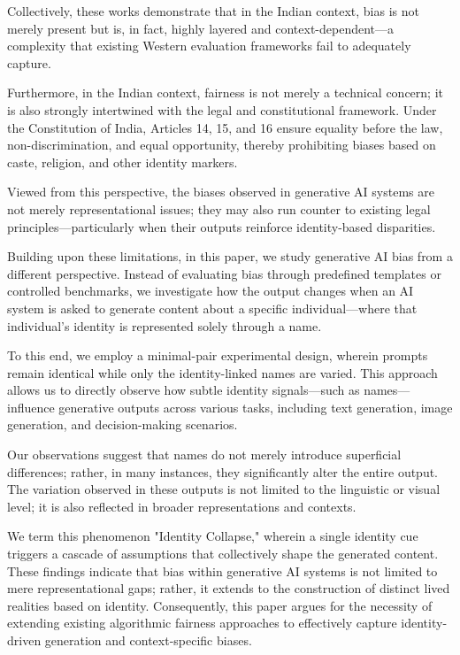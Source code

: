 \documentclass[sigplan,screen]{acmart}
\begin{document}
Collectively, these works demonstrate that in the Indian context, bias is not merely present but is, in fact, highly layered and context-dependent—a complexity that existing Western evaluation frameworks fail to adequately capture.


Furthermore, in the Indian context, fairness is not merely a technical concern; it is also strongly intertwined with the legal and constitutional framework. Under the Constitution of India, Articles 14, 15, and 16 ensure equality before the law, non-discrimination, and equal opportunity, thereby prohibiting biases based on caste, religion, and other identity markers.

Viewed from this perspective, the biases observed in generative AI systems are not merely representational issues; they may also run counter to existing legal principles—particularly when their outputs reinforce identity-based disparities.


Building upon these limitations, in this paper, we study generative AI bias from a different perspective. Instead of evaluating bias through predefined templates or controlled benchmarks, we investigate how the output changes when an AI system is asked to generate content about a specific individual—where that individual's identity is represented solely through a name.

To this end, we employ a minimal-pair experimental design, wherein prompts remain identical while only the identity-linked names are varied. This approach allows us to directly observe how subtle identity signals—such as names—influence generative outputs across various tasks, including text generation, image generation, and decision-making scenarios.

Our observations suggest that names do not merely introduce superficial differences; rather, in many instances, they significantly alter the entire output. The variation observed in these outputs is not limited to the linguistic or visual level; it is also reflected in broader representations and contexts.

We term this phenomenon "Identity Collapse," wherein a single identity cue triggers a cascade of assumptions that collectively shape the generated content.
These findings indicate that bias within generative AI systems is not limited to mere representational gaps; rather, it extends to the construction of distinct lived realities based on identity. Consequently, this paper argues for the necessity of extending existing algorithmic fairness approaches to effectively capture identity-driven generation and context-specific biases.
\end{document}
